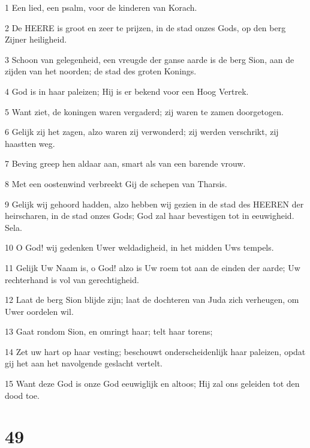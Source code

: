 \par 1 Een lied, een psalm, voor de kinderen van Korach.
\par 2 De HEERE is groot en zeer te prijzen, in de stad onzes Gods, op den berg Zijner heiligheid.
\par 3 Schoon van gelegenheid, een vreugde der ganse aarde is de berg Sion, aan de zijden van het noorden; de stad des groten Konings.
\par 4 God is in haar paleizen; Hij is er bekend voor een Hoog Vertrek.
\par 5 Want ziet, de koningen waren vergaderd; zij waren te zamen doorgetogen.
\par 6 Gelijk zij het zagen, alzo waren zij verwonderd; zij werden verschrikt, zij haastten weg.
\par 7 Beving greep hen aldaar aan, smart als van een barende vrouw.
\par 8 Met een oostenwind verbreekt Gij de schepen van Tharsis.
\par 9 Gelijk wij gehoord hadden, alzo hebben wij gezien in de stad des HEEREN der heirscharen, in de stad onzes Gods; God zal haar bevestigen tot in eeuwigheid. Sela.
\par 10 O God! wij gedenken Uwer weldadigheid, in het midden Uws tempels.
\par 11 Gelijk Uw Naam is, o God! alzo is Uw roem tot aan de einden der aarde; Uw rechterhand is vol van gerechtigheid.
\par 12 Laat de berg Sion blijde zijn; laat de dochteren van Juda zich verheugen, om Uwer oordelen wil.
\par 13 Gaat rondom Sion, en omringt haar; telt haar torens;
\par 14 Zet uw hart op haar vesting; beschouwt onderscheidenlijk haar paleizen, opdat gij het aan het navolgende geslacht vertelt.
\par 15 Want deze God is onze God eeuwiglijk en altoos; Hij zal ons geleiden tot den dood toe.

\chapter{49}

